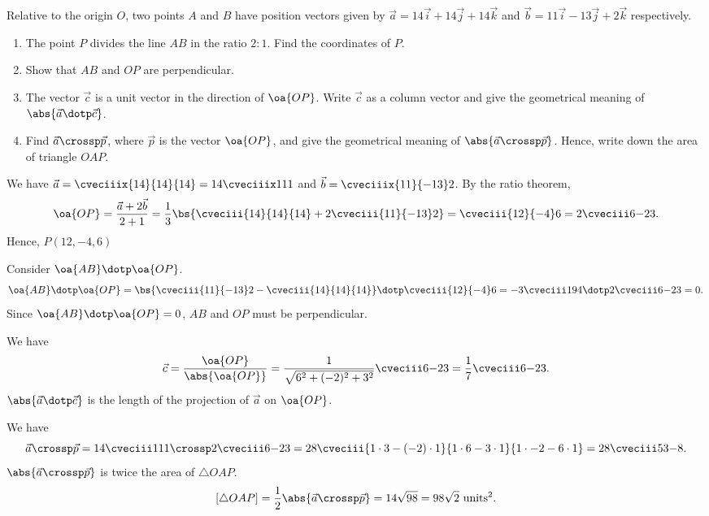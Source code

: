 \begin{problem}
    Relative to the origin $O$, two points $A$ and $B$ have position vectors given by $\vec a = 14 \vec i + 14 \vec j + 14 \vec k$ and $\vec b = 11\vec i - 13 \vec j + 2 \vec k$ respectively.

    \begin{enumerate}
        \item The point $P$ divides the line $AB$ in the ratio $2:1$. Find the coordinates of $P$.
        \item Show that $AB$ and $OP$ are perpendicular.
        \item The vector $\vec c$ is a unit vector in the direction of $\oa{OP}$. Write $\vec c$ as a column vector and give the geometrical meaning of $\abs{\vec a \dotp \vec c}$.
        \item Find $\vec a \crossp \vec p$, where $\vec p$ is the vector $\oa{OP}$, and give the geometrical meaning of $\abs{\vec a \crossp \vec p}$. Hence, write down the area of triangle $OAP$.
    \end{enumerate}
\end{problem}
\begin{solution}
    \begin{ppart}
        We have $\vec a = \cveciiix{14}{14}{14} = 14 \cveciiix111$ and $\vec b = \cveciiix{11}{-13}2$. By the ratio theorem, \[\oa{OP} = \frac{\vec a + 2\vec b}{2 + 1} = \frac13 \bs{\cveciii{14}{14}{14} + 2\cveciii{11}{-13}2} = \cveciii{12}{-4}6 = 2\cveciii6{-2}3.\] Hence, $P(12, -4, 6)$
    \end{ppart}
    \begin{ppart}
        Consider $\oa{AB} \dotp \oa{OP}$. \[\oa{AB} \dotp \oa{OP} = \bs{\cveciii{11}{-13}2 -  \cveciii{14}{14}{14}} \dotp \cveciii{12}{-4}6 = -3\cveciii194 \dotp 2\cveciii6{-2}3 = 0.\] Since $\oa{AB} \dotp \oa{OP} = 0$, $AB$ and $OP$ must be perpendicular.
    \end{ppart}
    \begin{ppart}
        We have \[\vec c = \frac{\oa{OP}}{\abs{\oa{OP}}} = \frac1{\sqrt{6^2 + (-2)^2 + 3^2}}\cveciii6{-2}3 = \frac17 \cveciii6{-2}3.\] $\abs{\vec a \dotp \vec c}$ is the length of the projection of $\vec a$ on $\oa{OP}$.
    \end{ppart}
    \begin{ppart}
        We have \[\vec a \crossp \vec p = 14 \cveciii111 \crossp 2 \cveciii6{-2}3 = 28 \cveciii{1 \cdot 3 - (-2) \cdot 1}{1 \cdot 6 - 3 \cdot 1}{1 \cdot -2 - 6 \cdot 1} = 28 \cveciii53{-8}.\] $\abs{\vec a \crossp \vec p}$ is twice the area of $\triangle OAP$. \[[\triangle OAP] = \frac12 \abs{\vec a \crossp \vec p} = 14 \sqrt{98} = 98 \sqrt 2 \text{ units$^2$}.\]
    \end{ppart}
\end{solution}


